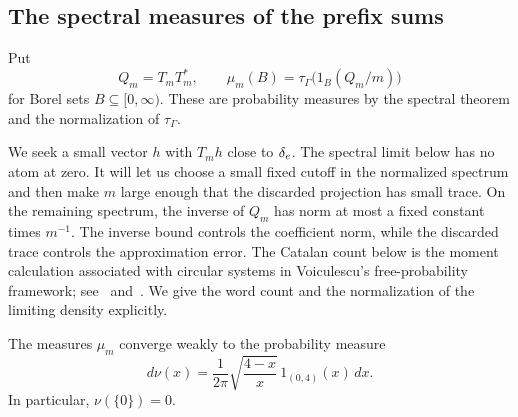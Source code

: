 \subsection{The spectral measures of the prefix sums}

Put
\begin{equation}
\label{eq:cocycle-positive-operator}
  Q_m=T_mT_m^*,
  \qquad
  \mu_m(B)=\tau_\Gamma\bigl(1_B(Q_m/m)\bigr)
\end{equation}
for Borel sets $B\subseteq[0,\infty)$.
These are probability measures by the spectral theorem and the
normalization of $\tau_\Gamma$.

We seek a small vector $h$ with $T_mh$ close to $\delta_e$. The spectral
limit below has no atom at zero. It will let us choose a small fixed
cutoff in the normalized spectrum and then make $m$ large enough that
the discarded projection has small trace. On the remaining spectrum,
the inverse of $Q_m$ has norm at most a fixed constant times $m^{-1}$.
The inverse bound controls the coefficient norm, while the discarded
trace controls the approximation error.
The Catalan count below is the moment calculation associated with
circular systems in Voiculescu's free-probability framework;
see~\cite{voiculescu1985} and~\cite[Definition~1.9 and Remark~1.11]{voiculescu1990}.
We give the word count and the normalization of the limiting density
explicitly.

\begin{lemma}
\label{lem:cocycle-spectrum}
The measures $\mu_m$ converge weakly to the probability measure
\begin{equation}
\label{eq:cocycle-limit-density}
  d\nu(x)=\frac{1}{2\pi}\sqrt{\frac{4-x}{x}}
           \,1_{(0,4)}(x)\,dx.
\end{equation}
In particular, $\nu(\{0\})=0$.
\end{lemma}

